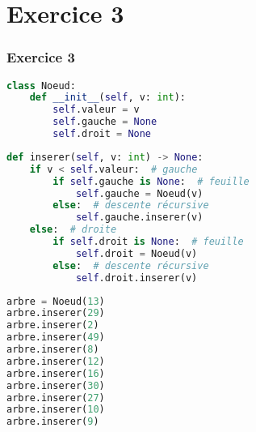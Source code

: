 \documentclass[svgnames,11pt]{beamer}
\begin{document}
\section{Exercice 3}
\begin{frame}[fragile]
    \frametitle{Exercice 3}

    \begin{center}
        \begin{lstlisting}[language=Python , basicstyle=\ttfamily\small, xleftmargin=0.5em, xrightmargin=0em]
class Noeud:
    def __init__(self, v: int):
        self.valeur = v
        self.gauche = None
        self.droit = None
\end{lstlisting}
    \end{center}

\end{frame}
\begin{frame}[fragile]

    \begin{center}
        \begin{lstlisting}[language=Python , basicstyle=\ttfamily\small, xleftmargin=0.5em, xrightmargin=0em]
def inserer(self, v: int) -> None:
    if v < self.valeur:  # gauche
        if self.gauche is None:  # feuille
            self.gauche = Noeud(v)
        else:  # descente récursive
            self.gauche.inserer(v)
    else:  # droite
        if self.droit is None:  # feuille
            self.droit = Noeud(v)
        else:  # descente récursive
            self.droit.inserer(v)
\end{lstlisting}
    \end{center}

\end{frame}
\begin{frame}[fragile]

    \begin{center}
        \begin{lstlisting}[language=Python , basicstyle=\ttfamily\small, xleftmargin=0.5em, xrightmargin=0em]
arbre = Noeud(13)
arbre.inserer(29)
arbre.inserer(2)
arbre.inserer(49)
arbre.inserer(8)
arbre.inserer(12)
arbre.inserer(16)
arbre.inserer(30)
arbre.inserer(27)
arbre.inserer(10)
arbre.inserer(9)
\end{lstlisting}
    \end{center}

\end{frame}
\end{document}
